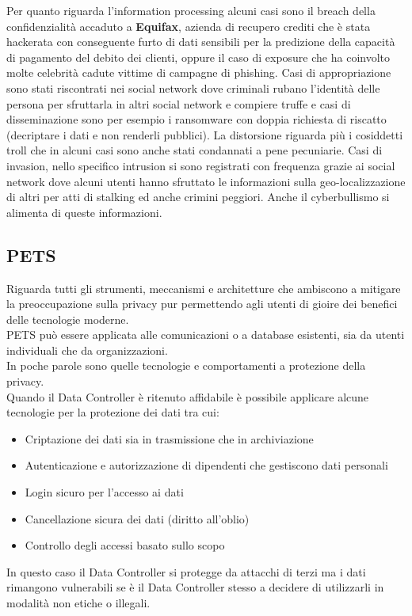 Per quanto riguarda l'information processing alcuni casi sono il breach della confidenzialità accaduto a \textbf{Equifax}, azienda di recupero crediti che è stata hackerata con conseguente furto di dati sensibili per la predizione della capacità di pagamento del debito dei clienti, oppure il caso di exposure che ha coinvolto molte celebrità cadute vittime di campagne di phishing.
Casi di appropriazione sono stati riscontrati nei social network dove criminali rubano l'identità delle persona per sfruttarla in altri social network e compiere truffe e casi di disseminazione sono per esempio i ransomware con doppia richiesta di riscatto (decriptare i dati e non renderli pubblici).
La distorsione riguarda più i cosiddetti troll che in alcuni casi sono anche stati condannati a pene pecuniarie.
Casi di invasion, nello specifico intrusion si sono registrati con frequenza grazie ai social network dove alcuni utenti hanno sfruttato le informazioni sulla geo-localizzazione di altri per atti di stalking ed anche crimini peggiori.
Anche il cyberbullismo si alimenta di queste informazioni.

\subsection{\acrfull{PETS}}
Riguarda tutti gli strumenti, meccanismi e architetture che ambiscono a mitigare la preoccupazione sulla privacy pur permettendo agli utenti di gioire dei benefici delle tecnologie moderne.\\
\acrshort{PETS} può essere applicata alle comunicazioni o a database esistenti, sia da utenti individuali che da organizzazioni.\\
In poche parole sono quelle tecnologie e comportamenti a protezione della privacy.\\
Quando il Data Controller è ritenuto affidabile è possibile applicare alcune tecnologie per la protezione dei dati tra cui:
\begin{itemize}[noitemsep]
    \item Criptazione dei dati sia in trasmissione che in archiviazione
    \item Autenticazione e autorizzazione di dipendenti che gestiscono dati personali
    \item Login sicuro per l'accesso ai dati
    \item Cancellazione sicura dei dati (diritto all'oblio)
    \item Controllo degli accessi basato sullo scopo
\end{itemize}
In questo caso il Data Controller si protegge da attacchi di terzi ma i dati rimangono vulnerabili se è il Data Controller stesso a decidere di utilizzarli in modalità non etiche o illegali.


